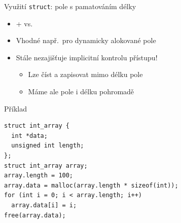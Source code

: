 \begin{frame}[fragile]{Využití \texttt{struct}: pole s pamatováním délky}

  \begin{itemize}
    \item {} +  vs.\ 
    \item Vhodné např.\ pro dynamicky alokované pole

    \pause

    \item Stále nezajišťuje implicitní kontrolu přístupu!
    \begin{itemize}
      \item Lze číst a zapisovat mimo délku pole
      \item Máme ale pole i délku pohromadě
    \end{itemize}

  \end{itemize}


\begin{block}{Příklad}
\begin{lstlisting}
struct int_array {
  int *data;
  unsigned int length;
};
struct int_array array;
array.length = 100;
array.data = malloc(array.length * sizeof(int));
for (int i = 0; i < array.length; i++)
  array.data[i] = i;
free(array.data);
\end{lstlisting}
\end{block}

\end{frame}

